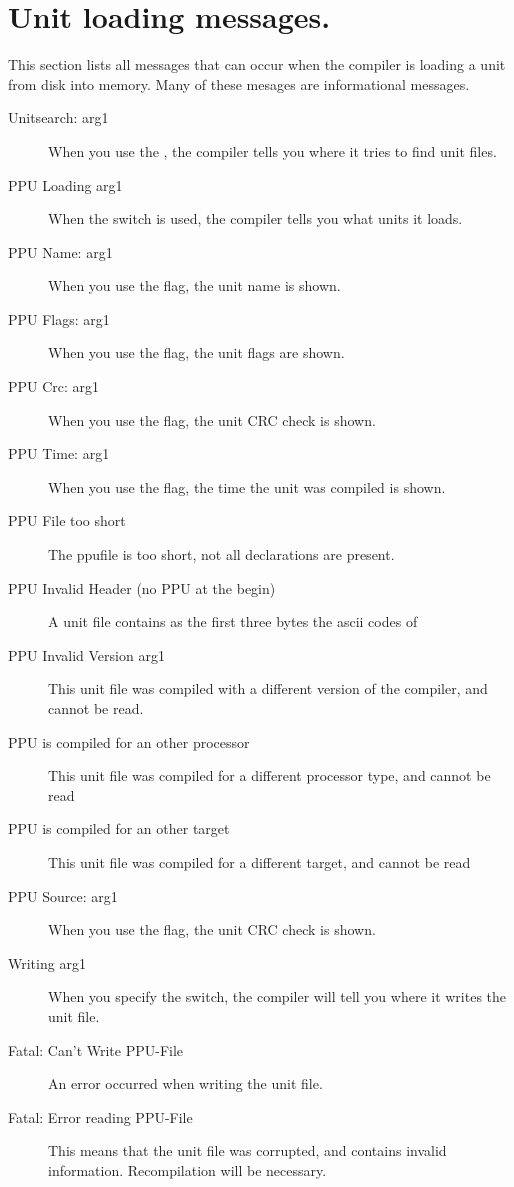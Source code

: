  \section{Unit loading messages.}
 This section lists all messages that can occur when the compiler is
 loading a unit from disk into memory. Many of these mesages are
 informational messages.
 \begin{description}
\item [Unitsearch: arg1]
 When you use the , the compiler tells you where it tries to find
 unit files.
\item [PPU Loading arg1]
 When the  switch is used, the compiler tells you
 what units it loads.
\item [PPU Name: arg1]
 When you use the  flag, the unit name is shown.
\item [PPU Flags: arg1]
 When you use the  flag, the unit flags are shown.
\item [PPU Crc: arg1]
 When you use the  flag, the unit CRC check is shown.
\item [PPU Time: arg1]
 When you use the  flag, the time the unit was compiled is shown.
\item [PPU File too short]
 The ppufile is too short, not all declarations are present.
\item [PPU Invalid Header (no PPU at the begin)]
 A unit file contains as the first three bytes the ascii codes of 
\item [PPU Invalid Version arg1]
 This unit file was compiled with a different version of the compiler, and
 cannot be read.
\item [PPU is compiled for an other processor]
 This unit file was compiled for a different processor type, and
 cannot be read
\item [PPU is compiled for an other target]
 This unit file was compiled for a different target, and
 cannot be read
\item [PPU Source: arg1]
 When you use the  flag, the unit CRC check is shown.
\item [Writing arg1]
 When you specify the  switch, the compiler will tell you where it
 writes the unit file.
\item [Fatal: Can't Write PPU-File]
 An error occurred when writing the unit file.
\item [Fatal: Error reading PPU-File]
 This means that the unit file was corrupted, and contains invalid
 information. Recompilation will be necessary.

\end{description}
